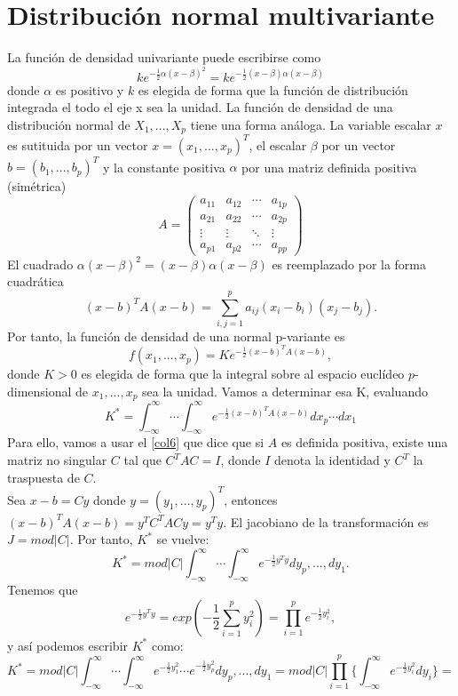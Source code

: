 \section{Distribución normal multivariante}
La función de densidad univariante puede escribirse como
\[ ke^{-\frac{1}{2}\alpha(x-\beta)^{2}}=ke^{-\frac{1}{2}(x-\beta)\alpha(x-\beta)} \]
donde $\alpha$ es positivo y $k$ es elegida de forma que la función de distribución integrada el todo el eje x sea la unidad. La función de densidad de una distribución normal de $X_{1},...,X_{p}$ tiene una forma análoga. La variable escalar $x$ es sutituida por un vector $x=(x_{1},...,x_{p})^{T}$, el escalar $\beta$ por un vector $b=(b_{1},...,b_p)^T$ y la constante positiva $\alpha$ por una matriz definida positiva (simétrica)
\begin{equation}
A=\begin{pmatrix}
a_{11} & a_{12} & \cdots & a_{1p}\\
a_{21} & a_{22} & \cdots & a_{2p}\\
\vdots & \vdots & \ddots & \vdots\\
a_{p1} & a_{p2} & \cdots & a_{pp}
\end{pmatrix}
\end{equation} 
El cuadrado $\alpha(x-\beta)^2=(x-\beta)\alpha(x-\beta)$ es reemplazado por la forma cuadrática
\[ (x-b)^T A (x-b) = \sum_{i,j=1}^{p}a_{ij}(x_i-b_i)(x_j-b_j). \]
Por tanto, la función de densidad de una normal p-variante es
\[ f(x_1,...,x_p)=Ke^{-\frac{1}{2}(x-b)^T A (x-b)} ,\]
donde $K>0$ es elegida de forma que la integral sobre al espacio euclídeo $p$-dimensional de $x_1,...,x_p$ sea la unidad. Vamos a determinar esa K, evaluando
\[ K^* = \int_{-\infty}^{\infty} \dotsb \int_{-\infty}^{\infty} e^{-\frac{1}{2}(x-b)^T A (x-b)} dx_p \dotsb dx_1 \]
Para ello, vamos a usar el \autoref{col6} que dice que si $A$ es definida positiva, existe una matriz no singular $C$ tal que $C^TAC=I$, donde $I$ denota la identidad y $C^T$ la traspuesta de $C$.\\
Sea $x-b=Cy$ donde $y=(y_1,...,y_p)^T$, entonces $(x-b)^TA(x-b)=y^TC^TACy=y^Ty$. El jacobiano de la transformación es $J=mod \vert C \vert$. Por tanto, $K^*$ se vuelve:
\[ K^*=mod \vert C \vert \int_{-\infty}^{\infty} \dotsb \int_{-\infty}^{\infty} e^{-\frac{1}{2}y^Ty} dy_p,...,dy_1. \]
Tenemos que
\[ e^{-\frac{1}{2}y^Ty}=exp \left( -\frac{1}{2} \sum_{i=1}^p y_i^2 \right) = \prod_{i=1}^p e^{-\frac{1}{2}y_i^2},\]
y así podemos escribir $K^*$ como:
\[ K^*=mod \vert C \vert \int_{-\infty}^{\infty} \dotsb \int_{-\infty}^{\infty} e^{-\frac{1}{2}y_1^2} \dotsb e^{-\frac{1}{2}y_p^2} dy_p,...,dy_1 = mod \vert C \vert \prod_{i=1}^p \lbrace \int_{-\infty}^{\infty} e^{-\frac{1}{2}y_i^2} dy_i \rbrace= \]
